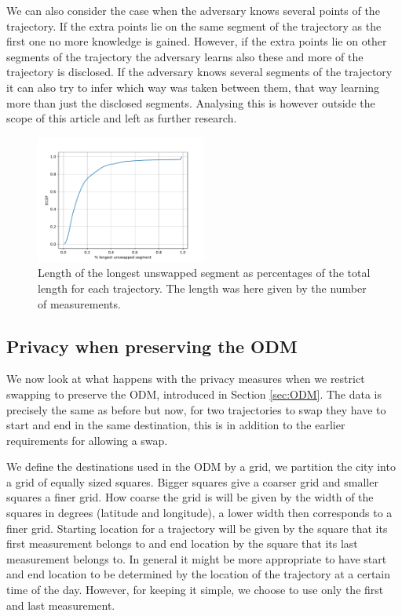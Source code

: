 \documentclass{llncs}
\begin{document}
We can also consider the case when the adversary knows several points
of the trajectory. If the extra points lie on the same segment of the
trajectory as the first one no more knowledge is gained. However, if
the extra points lie on other segments of the trajectory the adversary
learns also these and more of the trajectory is disclosed. If the
adversary knows several segments of the trajectory it can also try to
infer which way was taken between them, that way learning more than
just the disclosed segments. Analysing this is however outside the
scope of this article and left as further research.

\begin{figure}
  \center
  \includegraphics[width=0.5\textwidth]{figures/ECDF-max-part.pdf}
  \caption{Length of the longest unswapped segment as percentages of
    the total length for each trajectory. The length was here given by
    the number of measurements.}
  \label{fig:ECDF-max-part}
\end{figure}

\subsection{Privacy when preserving the ODM}
We now look at what happens with the privacy measures when we restrict
swapping to preserve the ODM, introduced in Section \ref{sec:ODM}. The
data is precisely the same as before but now, for two trajectories to
swap they have to start and end in the same destination, this is in
addition to the earlier requirements for allowing a swap.

We define the destinations used in the ODM by a grid, we partition the
city into a grid of equally sized squares. Bigger squares give a
coarser grid and smaller squares a finer grid. How coarse the grid is
will be given by the width of the squares in degrees (latitude and
longitude), a lower width then corresponds to a finer grid. Starting
location for a trajectory will be given by the square that its first
measurement belongs to and end location by the square that its last
measurement belongs to. In general it might be more appropriate to
have start and end location to be determined by the location of the
trajectory at a certain time of the day. However, for keeping it
simple, we choose to use only the first and last measurement.
\end{document}
